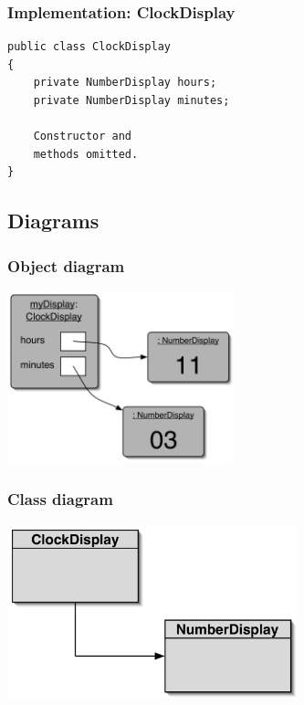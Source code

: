 \begin{frame}[fragile]
\frametitle{Implementation: ClockDisplay}
\codelist
\begin{lstlisting}[linewidth=7cm]
public class ClockDisplay
{
    private NumberDisplay hours;
    private NumberDisplay minutes;

    Constructor and
    methods omitted.
}
\end{lstlisting}
\end{frame}

\subsection{Diagrams}

\begin{frame}
\frametitle{Object diagram}
\begin{center}
\includegraphics[height=5cm, keepaspectratio]{./figures/object}
\end{center}
\end{frame}

\begin{frame}
\frametitle{Class diagram}
\begin{center}
\includegraphics[height=5cm, keepaspectratio]{./figures/class}
\end{center}
\end{frame}

